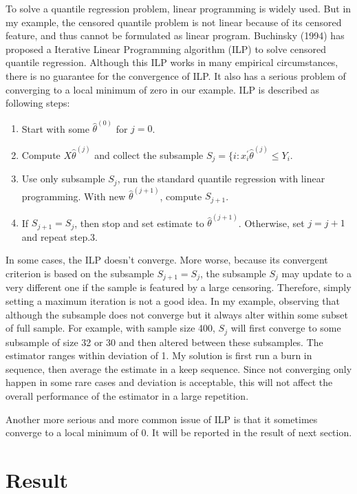 \documentclass[12pt]{article}
\theoremstyle{plain} \newtheorem{theorem}{Theorem}
\theoremstyle{definition} \newtheorem{definition}{Definition}
\begin{document}
To solve a quantile regression problem, linear programming is widely used. But in my example, the censored quantile problem is not linear because of its censored feature, and thus cannot be formulated as linear program. Buchinsky (1994) has proposed a Iterative Linear Programming algorithm (ILP) to solve censored quantile regression. Although this ILP works in many empirical circumstances, there is no guarantee for the convergence of ILP. It also has a serious problem of converging to a local minimum of zero in our example. ILP is described as following steps:
\begin{enumerate}
    \item Start with some $\hat{\theta}^{(0)}$ for $j=0$.
    \item Compute $X\hat{\theta}^{(j)}$ and collect the subsample $S_j = \{ i: x_i^{'}\hat{\theta}^{(j)}\leq Y_i$.
    \item Use only subsample $S_j$, run the standard quantile regression with linear programming. With new $\hat{\theta}^{(j+1)}$, compute $S_{j+1}$.
    \item If $S_{j+1} = S_j$, then stop and set estimate to $\hat{\theta}^{(j+1)}$. Otherwise, set $j=j+1$ and repeat step.3.
\end{enumerate}
In some cases, the ILP doesn't converge. More worse, because its convergent criterion is based on the subsample $S_{j+1}=S_j$, the subsample $S_j$ may update to a very different one if the sample is featured by a large censoring. Therefore, simply setting a maximum iteration is not a good idea. In my example, observing that although the subsample does not converge but it always alter within some subset of full sample. For example, with sample size 400, $S_j$ will first converge to some subsample of size 32 or 30 and then altered between these subsamples. The estimator ranges within deviation of 1. My solution is first run a burn in sequence, then average the estimate in a keep sequence. Since not converging only happen in some rare cases and deviation is acceptable, this will not affect the overall performance of the estimator in a large repetition.

Another more serious and more common issue of ILP is that it sometimes converge to a local minimum of 0. It will be reported in the result of next section.

\section{Result}
\label{sec:result}
\end{document}

